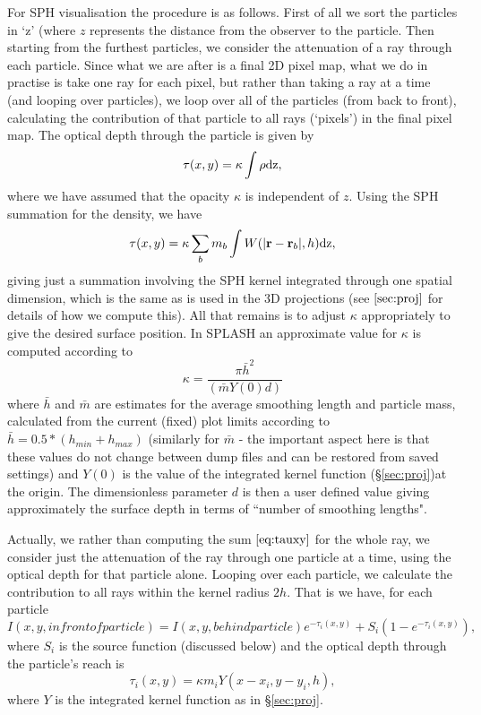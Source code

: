 \documentclass[a4paper,11pt]{article}
\begin{document}
 For SPH visualisation the procedure is as follows. First of all we sort the particles in `z' (where
$z$ represents the distance from the observer to the particle. Then starting from the furthest
particles, we consider the attenuation of a ray through each particle. Since what we are after is a
final 2D pixel map, what we do in practise is take one ray for each pixel, but rather than taking a
ray at a time (and looping over particles), we loop over all of the particles (from back to front),
calculating the contribution of that particle to all rays (`pixels') in the final pixel map. The
optical depth through the particle is given by
\begin{equation}
\tau(x,y) = \kappa \int \rho {\rm dz},
\end{equation}
where we have assumed that the opacity $\kappa$ is independent of $z$. Using the SPH summation for
the density, we have
\begin{equation}
\tau(x,y) = \kappa \sum_b m_b \int W(\vert {\bf r} - {\bf r}_b \vert,h) {\rm dz},
\label{eq:tauxy}
\end{equation}
giving just a summation involving the SPH kernel integrated through one spatial dimension, which is
the same as is used in the 3D projections (see $\ref{sec:proj}$ for details of how we compute this).
All that remains is to adjust $\kappa$ appropriately to give the desired surface position. In
SPLASH an approximate value for $\kappa$ is computed according to
\begin{equation}
\kappa = \frac{\pi \bar{h}^2 }{ (\bar{m}Y(0) d)}
\end{equation} 
where $\bar{h}$ and $\bar{m}$ are estimates for the average smoothing length and particle mass, calculated from the current (fixed) plot limits according to $\bar{h} = 0.5*(h_{min} + h_{max})$
(similarly for $\bar{m}$ - the important aspect here is that these values do not change between dump
files and can be restored from saved settings) and $Y(0)$ is the value of the integrated kernel function
(\S\ref{sec:proj})at the origin. The dimensionless parameter $d$ is then a user defined value giving
approximately the surface depth in terms of ``number of smoothing lengths".


 Actually, we rather than computing the sum $\ref{eq:tauxy}$ for the whole ray, we consider just the
attenuation of the ray through one particle at a time, using the optical depth for that particle alone.
Looping over each particle, we calculate the contribution to all rays within the kernel radius $2h$. That
is we have, for each particle
\begin{equation}
I(x,y,in front of particle) = I(x,y,behind particle) e^{-\tau_i(x,y)} + S_i(1 - e^{-\tau_i(x,y)}),
\label{eq:transportp}
\end{equation} 
where $S_i$ is the source function (discussed below) and the optical depth through the particle's reach is
\begin{equation}
\tau_i (x,y) = \kappa m_i Y(x-x_i,y-y_i,h),
\end{equation}
where $Y$ is the integrated kernel function as in \S\ref{sec:proj}.
\end{document}
